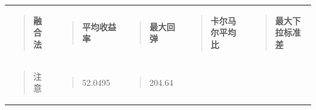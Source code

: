 \documentclass[UTF8]{ctexart}
\newcounter{none} %
\begin{document}
{\def\LTcaptype{none} %
\begin{longtable}[]{@{}
  >{\raggedright\arraybackslash}p{}
  >{\raggedright\arraybackslash}p{}
  >{\raggedright\arraybackslash}p{}
  >{\raggedright\arraybackslash}p{}
  >{\raggedright\arraybackslash}p{}@{}}
\toprule\noalign{}
\endhead
\bottomrule\noalign{}
\endlastfoot
\begin{minipage}[t]{\linewidth}\raggedright
\begin{quote}
\textbf{融合法}
\end{quote}
\end{minipage} & \begin{minipage}[t]{\linewidth}\raggedright
\begin{quote}
\textbf{平均收益率}
\end{quote}
\end{minipage} & \begin{minipage}[t]{\linewidth}\raggedright
\begin{quote}
\textbf{最大回弹}
\end{quote}
\end{minipage} & \begin{minipage}[t]{\linewidth}\raggedright
\begin{quote}
\textbf{卡尔马尔平均比}
\end{quote}
\end{minipage} & \begin{minipage}[t]{\linewidth}\raggedright
\begin{quote}
\textbf{最大下拉标准差}
\end{quote}
\end{minipage} \\
\begin{minipage}[t]{\linewidth}\raggedright
\begin{quote}
注意
\end{quote}
\end{minipage} & \begin{minipage}[t]{\linewidth}\raggedright
\begin{quote}
52.0495
\end{quote}
\end{minipage} & \begin{minipage}[t]{\linewidth}\raggedright
\begin{quote}
204.64

\end{quote}
\end{minipage}
\end{longtable}}
\end{document}
